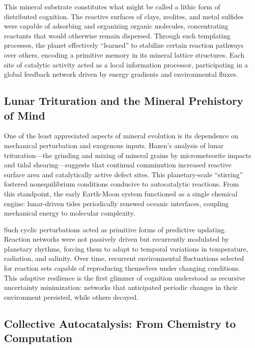 \documentclass[11pt,a4paper]{article}
\begin{document}
This mineral substrate constitutes what might be called a lithic form of distributed cognition.  The reactive surfaces of clays, zeolites, and metal sulfides were capable of adsorbing and organizing organic molecules, concentrating reactants that would otherwise remain dispersed.  Through such templating processes, the planet effectively “learned” to stabilize certain reaction pathways over others, encoding a primitive memory in its mineral lattice structures.  Each site of catalytic activity acted as a local information processor, participating in a global feedback network driven by energy gradients and environmental fluxes.

\subsection{Lunar Trituration and the Mineral Prehistory of Mind}

One of the least appreciated aspects of mineral evolution is its dependence on mechanical perturbation and exogenous inputs.  Hazen’s analysis of lunar trituration---the grinding and mixing of mineral grains by micrometeorite impacts and tidal shearing---suggests that continual comminution increased reactive surface area and catalytically active defect sites.  This planetary-scale “stirring” fostered nonequilibrium conditions conducive to autocatalytic reactions.  From this standpoint, the early Earth-Moon system functioned as a single chemical engine: lunar-driven tides periodically renewed oceanic interfaces, coupling mechanical energy to molecular complexity.  

Such cyclic perturbations acted as primitive forms of predictive updating.  Reaction networks were not passively driven but recurrently modulated by planetary rhythms, forcing them to adapt to temporal variations in temperature, radiation, and salinity.  Over time, recurrent environmental fluctuations selected for reaction sets capable of reproducing themselves under changing conditions.  This adaptive resilience is the first glimmer of cognition understood as recursive uncertainty minimization: networks that anticipated periodic changes in their environment persisted, while others decayed.

\subsection{Collective Autocatalysis: From Chemistry to Computation}
\end{document}
